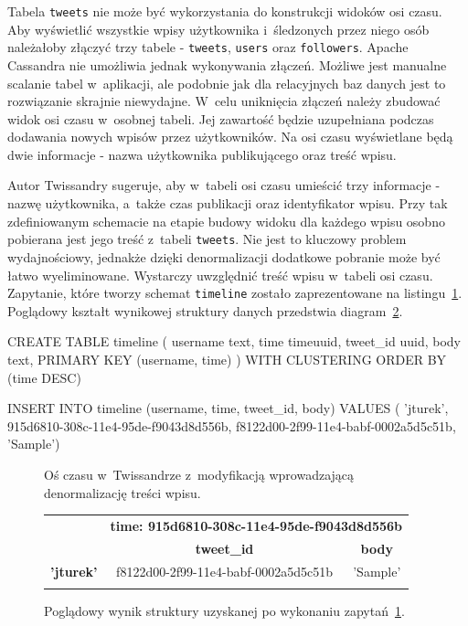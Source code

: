 Tabela \verb+tweets+ nie może być wykorzystania do konstrukcji widoków osi czasu. Aby wyświetlić wszystkie wpisy użytkownika i~śledzonych przez niego osób należałoby złączyć trzy tabele - \verb+tweets+, \verb+users+ oraz \verb+followers+. Apache Cassandra nie umożliwia jednak wykonywania złączeń. Możliwe jest manualne scalanie tabel w~aplikacji, ale podobnie jak dla relacyjnych baz danych jest to rozwiązanie skrajnie niewydajne. W~celu uniknięcia złączeń należy zbudować widok osi czasu w~osobnej tabeli. Jej zawartość będzie uzupełniana podczas dodawania nowych wpisów przez użytkowników. Na osi czasu wyświetlane będą dwie informacje - nazwa użytkownika publikującego oraz treść wpisu. 

Autor Twissandry sugeruje, aby w~tabeli osi czasu umieścić trzy informacje - nazwę użytkownika, a~także czas publikacji oraz identyfikator wpisu. Przy tak zdefiniowanym schemacie na etapie budowy widoku dla każdego wpisu osobno pobierana jest jego treść z~tabeli \verb+tweets+. Nie jest to kluczowy problem wydajnościowy, jednakże dzięki denormalizacji dodatkowe pobranie może być łatwo wyeliminowane. Wystarczy uwzględnić treść wpisu w~tabeli osi czasu. Zapytanie, które tworzy schemat \verb+timeline+ zostało zaprezentowane na listingu~\ref{lst:timeline}. Poglądowy kształt wynikowej struktury danych przedstwia diagram~\ref{tab:timeline_structure}.

\begin{verbbox}
CREATE TABLE timeline (
    username text,
    time timeuuid,
    tweet_id uuid,
    body text,
    PRIMARY KEY (username, time)
) WITH CLUSTERING ORDER BY (time DESC)

INSERT INTO timeline (username, time, tweet_id, body) VALUES (
    'jturek',
    915d6810-308c-11e4-95de-f9043d8d556b,
    f8122d00-2f99-11e4-babf-0002a5d5c51b,
    'Sample')
\end{verbbox}

\begin{figure}[ht!]
	\centering
	\theverbbox
	\caption{Oś czasu w~Twissandrze z~modyfikacją wprowadzającą denormalizację treści wpisu.}
	\label{lst:timeline}
\end{figure}

\begin{figure}[ht!]
	\centering
	\begin{tabular}{|l||c|c|}
		\hhline{|-||--|}
		& \multicolumn{2}{|c|}{\textbf{time: 915d6810-308c-11e4-95de-f9043d8d556b}} \\
		\hhline{|~||==|}
		& \textbf{tweet\_id} & \textbf{body} \\
		\hhline{|~||==|}
		\textbf{'jturek'} & f8122d00-2f99-11e4-babf-0002a5d5c51b & 'Sample' \\
		\hhline{|-||--|}
	\end{tabular} 

	\caption{Poglądowy wynik struktury uzyskanej po wykonaniu zapytań~\ref{lst:timeline}.}
	\label{tab:timeline_structure}
\end{figure}

